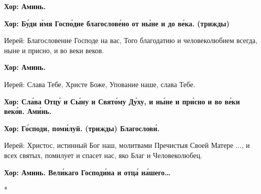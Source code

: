 \documentclass[12pt,a4paper,titlepage]{report}
\begin{document}
\begin{paracol}[1]{2}
	\textbf{Хор: Аминь.}

	\textbf{Хор: Бу́ди и́мя Госпо́дне благослове́но от ны́не и до ве́ка. (трижды)}
	
	Иерей: Благословение Господе на вас, Того благодатию и человеколюбием всегда, ныне и присно, и во веки веков.
	
	\textbf{Хор: Аминь.}
	
	Иерей: Слава Тебе, Христе Боже, Упование наше, слава Тебе.
	
	\textbf{Хор: Сла́ва Отцу́ и Сы́ну и Свято́му Ду́ху, и ны́не и при́сно и во ве́ки веко́в. Ами́нь.}

	\textbf{Хор: Го́споди, поми́луй. (трижды) Благослови́.}
	
	Иерей: Христос, истинный Бог наш, молитвами Пречистыя Своей Матере ..., и всех святых, помилует и спасет нас, яко Благ и Человеколюбец.
	
	\textbf{Хор: Аминь. Вели́каго Господи́на и отца́ на́шего\ldots}
	
	\switchcolumn[0]*
	
	\switchcolumn[1]
\end{paracol}
\end{document}
